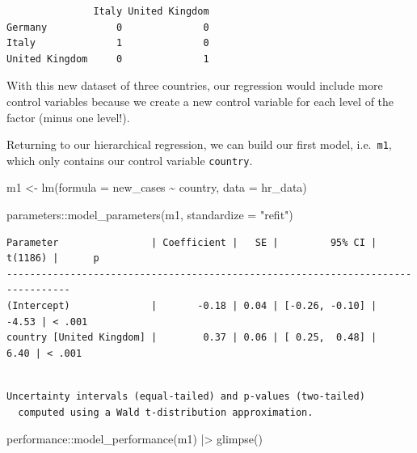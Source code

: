 \documentclass[
  letterpaper,
]{krantz}
\makeatletter
\newenvironment{Shaded}{\begin{snugshade}}{\end{snugshade}}
\newcommand{\AttributeTok}[1]{\textcolor[rgb]{0.40,0.45,0.13}{#1}}
\newcommand{\FunctionTok}[1]{\textcolor[rgb]{0.28,0.35,0.67}{#1}}
\newcommand{\NormalTok}[1]{\textcolor[rgb]{0.00,0.23,0.31}{#1}}
\newcommand{\OtherTok}[1]{\textcolor[rgb]{0.00,0.23,0.31}{#1}}
\newcommand{\SpecialCharTok}[1]{\textcolor[rgb]{0.37,0.37,0.37}{#1}}
\newcommand{\StringTok}[1]{\textcolor[rgb]{0.13,0.47,0.30}{#1}}
\newenvironment{kframe}{%
\medskip{}
\setlength{\fboxsep}{.8em}
 \def\at@end@of@kframe{}%
 \ifinner\ifhmode%
  \def\at@end@of@kframe{\end{minipage}}%
  \begin{minipage}{\columnwidth}%
 \fi\fi%
 \def\FrameCommand##1{\hskip\@totalleftmargin \hskip-\fboxsep
 \colorbox{shadecolor}{##1}\hskip-\fboxsep
     \hskip-\linewidth \hskip-\@totalleftmargin \hskip\columnwidth}%
 \MakeFramed {\advance\hsize-\width
   \@totalleftmargin\z@ \linewidth\hsize
   \@setminipage}}%
 {\par\unskip\endMakeFramed%
 \at@end@of@kframe}
\renewenvironment{Shaded}{\begin{kframe}}{\end{kframe}}
\makeatother
\begin{document}
\begin{verbatim}
               Italy United Kingdom
Germany            0              0
Italy              1              0
United Kingdom     0              1
\end{verbatim}

With this new dataset of three countries, our regression would include
more control variables because we create a new control variable for each
level of the factor (minus one level!).

Returning to our hierarchical regression, we can build our first model,
i.e.~\texttt{m1}, which only contains our control variable
\texttt{country}.

\begin{Shaded}
\begin{Highlighting}[]
\NormalTok{m1 }\OtherTok{\textless{}{-}} \FunctionTok{lm}\NormalTok{(}\AttributeTok{formula =}\NormalTok{ new\_cases }\SpecialCharTok{\textasciitilde{}}\NormalTok{ country,}
         \AttributeTok{data =}\NormalTok{ hr\_data)}

\NormalTok{parameters}\SpecialCharTok{::}\FunctionTok{model\_parameters}\NormalTok{(m1, }\AttributeTok{standardize =} \StringTok{"refit"}\NormalTok{)}
\end{Highlighting}
\end{Shaded}

\begin{verbatim}
Parameter                | Coefficient |   SE |         95% CI | t(1186) |      p
---------------------------------------------------------------------------------
(Intercept)              |       -0.18 | 0.04 | [-0.26, -0.10] |   -4.53 | < .001
country [United Kingdom] |        0.37 | 0.06 | [ 0.25,  0.48] |    6.40 | < .001
\end{verbatim}

\begin{verbatim}

Uncertainty intervals (equal-tailed) and p-values (two-tailed)
  computed using a Wald t-distribution approximation.
\end{verbatim}

\begin{Shaded}
\begin{Highlighting}[]
\NormalTok{performance}\SpecialCharTok{::}\FunctionTok{model\_performance}\NormalTok{(m1) }\SpecialCharTok{|\textgreater{}}
  \FunctionTok{glimpse}\NormalTok{()}
\end{Highlighting}
\end{Shaded}
\end{document}
